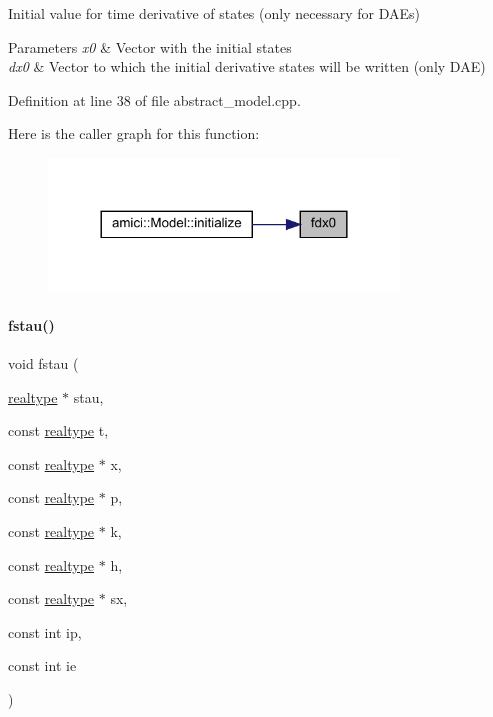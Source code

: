 Initial value for time derivative of states (only necessary for D\+A\+Es) 
\begin{DoxyParams}{Parameters}
{\em x0} & Vector with the initial states \\
\hline
{\em dx0} & Vector to which the initial derivative states will be written (only D\+AE) \\
\hline
\end{DoxyParams}


Definition at line 38 of file abstract\+\_\+model.\+cpp.

Here is the caller graph for this function\+:
\nopagebreak
\begin{figure}[H]
\begin{center}
\leavevmode
\includegraphics[width=264pt]{classamici_1_1_abstract_model_a8c3a1647a75581d9e2fc5de106d87a0d_icgraph}
\end{center}
\end{figure}
\mbox{\label{classamici_1_1_abstract_model_ad88b646b062ed844a5c2fd4b663c2dff}} 
\paragraph{\texorpdfstring{fstau()}{fstau()}}
{\footnotesize\ttfamily void fstau (\begin{DoxyParamCaption}\item[{\mbox{\hyperlink{namespaceamici_a1bdce28051d6a53868f7ccbf5f2c14a3}{realtype}} $\ast$}]{stau,  }\item[{const \mbox{\hyperlink{namespaceamici_a1bdce28051d6a53868f7ccbf5f2c14a3}{realtype}}}]{t,  }\item[{const \mbox{\hyperlink{namespaceamici_a1bdce28051d6a53868f7ccbf5f2c14a3}{realtype}} $\ast$}]{x,  }\item[{const \mbox{\hyperlink{namespaceamici_a1bdce28051d6a53868f7ccbf5f2c14a3}{realtype}} $\ast$}]{p,  }\item[{const \mbox{\hyperlink{namespaceamici_a1bdce28051d6a53868f7ccbf5f2c14a3}{realtype}} $\ast$}]{k,  }\item[{const \mbox{\hyperlink{namespaceamici_a1bdce28051d6a53868f7ccbf5f2c14a3}{realtype}} $\ast$}]{h,  }\item[{const \mbox{\hyperlink{namespaceamici_a1bdce28051d6a53868f7ccbf5f2c14a3}{realtype}} $\ast$}]{sx,  }\item[{const int}]{ip,  }\item[{const int}]{ie }\end{DoxyParamCaption})\hspace{0.3cm}{\ttfamily [virtual]}}

